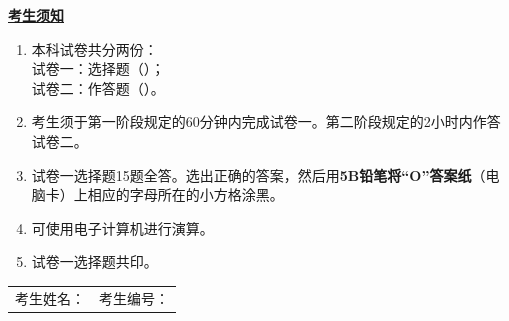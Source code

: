 \documentclass[12pt,a4paper]{exam-zh}
\begin{document}
    \vspace{2.0em}

    {\bfseries \underline{考生须知}\par}
    \vspace{0.8em}

    \begin{enumerate}[label=（\chinese*）,leftmargin=3em,itemsep=0.65em]
    \item 本科试卷共分两份：\\
    \hspace*{2em}试卷一：选择题（\paperonepercentage）；\\
    \hspace*{2em}试卷二：作答题（\papertwopercentage）。

    \item 考生须于第一阶段规定的60分钟内完成试卷一。第二阶段规定的2小时内作答试卷二。

    \item 试卷一选择题15题全答。选出正确的答案，然后用\textbf{5B铅笔将“O”答案纸}（电脑卡）上相应的字母所在的小方格涂黑。

    \item 可使用电子计算机进行演算。

    \item 试卷一选择题共印\questionpages。
    \end{enumerate}

    \vspace{2.0em}

    \begin{center}
    {%
    \setlength{\fboxrule}{3pt}%
    \setlength{\fboxsep}{1.5pt}%
    }
    \end{center}

    \vfill

    \begin{tabular*}{\linewidth}{@{\extracolsep{\fill}}ll}
    考生姓名：\underline{\hspace{4.2cm}} & 考生编号：\underline{\hspace{4.0cm}}
    \end{tabular*}

\end{document}
